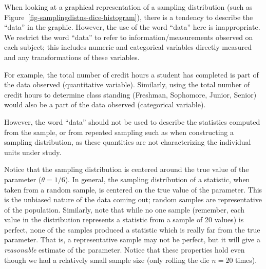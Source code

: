 \documentclass[
  letterpaper,
  DIV=11,
  numbers=noendperiod]{scrreprt}
\theoremstyle{definition}
\theoremstyle{definition}
\theoremstyle{plain}
\theoremstyle{remark}
\begin{document}
\begin{tcolorbox}[enhanced jigsaw, colbacktitle=quarto-callout-warning-color!10!white, colback=white, left=2mm, title=\textcolor{quarto-callout-warning-color}{\faExclamationTriangle}\hspace{0.5em}{Warning}, toptitle=1mm, leftrule=.75mm, breakable, bottomrule=.15mm, arc=.35mm, rightrule=.15mm, toprule=.15mm, coltitle=black, opacityback=0, colframe=quarto-callout-warning-color-frame, opacitybacktitle=0.6, bottomtitle=1mm, titlerule=0mm]

When looking at a graphical representation of a sampling distribution
(such as Figure~\ref{fig-samplingdistns-dice-histogram}), there is a
tendency to describe the ``data'' in the graphic. However, the use of
the word ``data'' here is inappropriate. We restrict the word ``data''
to refer to information/measurements observed on each subject; this
includes numeric and categorical variables directly measured and any
transformations of these variables.

For example, the total number of credit hours a student has completed is
part of the data observed (quantitative variable). Similarly, using the
total number of credit hours to determine class standing (Freshman,
Sophomore, Junior, Senior) would also be a part of the data observed
(categorical variable).

However, the word ``data'' should not be used to describe the statistics
computed from the sample, or from repeated sampling such as when
constructing a sampling distribution, as these quantities are not
characterizing the individual units under study.

\end{tcolorbox}

Notice that the sampling distribution is centered around the true value
of the parameter (\(\theta = 1/6\)). In general, the sampling
distribution of a statistic, when taken from a random sample, is
centered on the true value of the parameter. This is the unbiased nature
of the data coming out; random samples are representative of the
population. Similarly, note that while no one sample (remember, each
value in the distribution represents a statistic from a sample of 20
values) is perfect, none of the samples produced a statistic which is
really far from the true parameter. That is, a representative sample may
not be perfect, but it will give a \emph{reasonable} estimate of the
parameter. Notice that these properties hold even though we had a
relatively small sample size (only rolling the die \(n = 20\) times).
\end{document}
